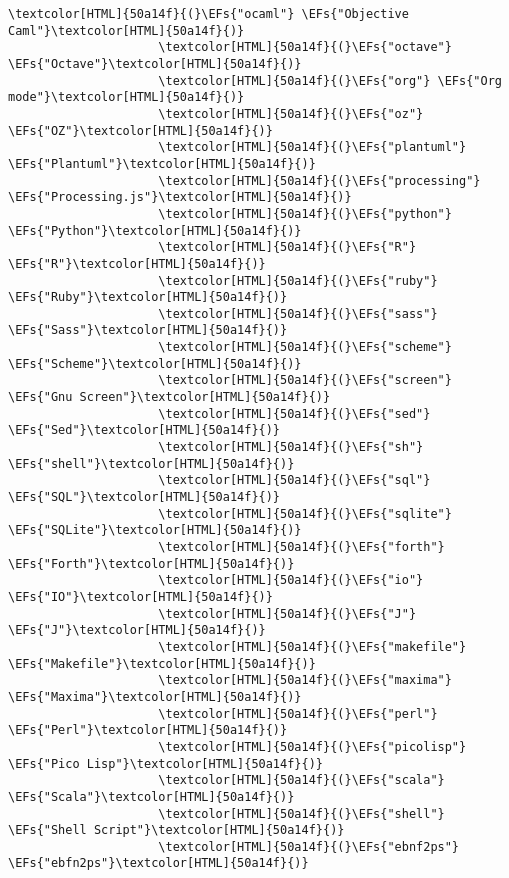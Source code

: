 \documentclass{scrartcl}
\newcommand{\EFs}[1]{\textcolor{EFs}{#1}} %
\begin{document}
\begin{Code}
\begin{Verbatim}[]
                     \textcolor[HTML]{50a14f}{(}\EFs{"ocaml"} \EFs{"Objective Caml"}\textcolor[HTML]{50a14f}{)}
                     \textcolor[HTML]{50a14f}{(}\EFs{"octave"} \EFs{"Octave"}\textcolor[HTML]{50a14f}{)}
                     \textcolor[HTML]{50a14f}{(}\EFs{"org"} \EFs{"Org mode"}\textcolor[HTML]{50a14f}{)}
                     \textcolor[HTML]{50a14f}{(}\EFs{"oz"} \EFs{"OZ"}\textcolor[HTML]{50a14f}{)}
                     \textcolor[HTML]{50a14f}{(}\EFs{"plantuml"} \EFs{"Plantuml"}\textcolor[HTML]{50a14f}{)}
                     \textcolor[HTML]{50a14f}{(}\EFs{"processing"} \EFs{"Processing.js"}\textcolor[HTML]{50a14f}{)}
                     \textcolor[HTML]{50a14f}{(}\EFs{"python"} \EFs{"Python"}\textcolor[HTML]{50a14f}{)}
                     \textcolor[HTML]{50a14f}{(}\EFs{"R"} \EFs{"R"}\textcolor[HTML]{50a14f}{)}
                     \textcolor[HTML]{50a14f}{(}\EFs{"ruby"} \EFs{"Ruby"}\textcolor[HTML]{50a14f}{)}
                     \textcolor[HTML]{50a14f}{(}\EFs{"sass"} \EFs{"Sass"}\textcolor[HTML]{50a14f}{)}
                     \textcolor[HTML]{50a14f}{(}\EFs{"scheme"} \EFs{"Scheme"}\textcolor[HTML]{50a14f}{)}
                     \textcolor[HTML]{50a14f}{(}\EFs{"screen"} \EFs{"Gnu Screen"}\textcolor[HTML]{50a14f}{)}
                     \textcolor[HTML]{50a14f}{(}\EFs{"sed"} \EFs{"Sed"}\textcolor[HTML]{50a14f}{)}
                     \textcolor[HTML]{50a14f}{(}\EFs{"sh"} \EFs{"shell"}\textcolor[HTML]{50a14f}{)}
                     \textcolor[HTML]{50a14f}{(}\EFs{"sql"} \EFs{"SQL"}\textcolor[HTML]{50a14f}{)}
                     \textcolor[HTML]{50a14f}{(}\EFs{"sqlite"} \EFs{"SQLite"}\textcolor[HTML]{50a14f}{)}
                     \textcolor[HTML]{50a14f}{(}\EFs{"forth"} \EFs{"Forth"}\textcolor[HTML]{50a14f}{)}
                     \textcolor[HTML]{50a14f}{(}\EFs{"io"} \EFs{"IO"}\textcolor[HTML]{50a14f}{)}
                     \textcolor[HTML]{50a14f}{(}\EFs{"J"} \EFs{"J"}\textcolor[HTML]{50a14f}{)}
                     \textcolor[HTML]{50a14f}{(}\EFs{"makefile"} \EFs{"Makefile"}\textcolor[HTML]{50a14f}{)}
                     \textcolor[HTML]{50a14f}{(}\EFs{"maxima"} \EFs{"Maxima"}\textcolor[HTML]{50a14f}{)}
                     \textcolor[HTML]{50a14f}{(}\EFs{"perl"} \EFs{"Perl"}\textcolor[HTML]{50a14f}{)}
                     \textcolor[HTML]{50a14f}{(}\EFs{"picolisp"} \EFs{"Pico Lisp"}\textcolor[HTML]{50a14f}{)}
                     \textcolor[HTML]{50a14f}{(}\EFs{"scala"} \EFs{"Scala"}\textcolor[HTML]{50a14f}{)}
                     \textcolor[HTML]{50a14f}{(}\EFs{"shell"} \EFs{"Shell Script"}\textcolor[HTML]{50a14f}{)}
                     \textcolor[HTML]{50a14f}{(}\EFs{"ebnf2ps"} \EFs{"ebfn2ps"}\textcolor[HTML]{50a14f}{)}

\end{Verbatim}
\end{Code}
\end{document}

